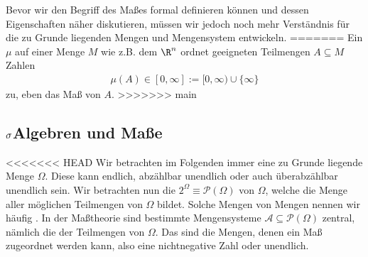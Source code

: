 \documentclass[letterpaper,10pt,english]{jupyterBook}
\begin{document}
\sphinxAtStartPar
Bevor wir den Begriff des Maßes formal definieren können und dessen Eigenschaften näher diskutieren, müssen wir jedoch noch mehr Verständnis für die zu Grunde liegenden Mengen und Mengensystem entwickeln.
=======
Ein  \(\mu\) auf einer Menge \(M\) wie z.B. dem \(\R^n\)
ordnet geeigneten Teilmengen \(A\subseteq M\)
Zahlen
\begin{equation*}
\begin{split}\mu(A)\in[0,\infty]:=[0,\infty)\cup\{\infty\}\end{split}
\end{equation*}
\sphinxAtStartPar
zu, eben das Maß von \(A\).
>>>>>>> main


\subsection{\protect\(\sigma\protect\)\sphinxhyphen{}Algebren und Maße}
\label{\detokenize{masstheorie/masstheorie:sigma-algebren-und-masze}}
\sphinxAtStartPar
<<<<<<< HEAD
Wir betrachten im Folgenden immer eine zu Grunde liegende Menge \(\Omega\).
Diese kann endlich, abzählbar unendlich oder auch überabzählbar unendlich sein.
Wir betrachten nun die  \(2^\Omega \equiv\mathcal{P}(\Omega)\) von \(\Omega\), welche die Menge aller möglichen Teilmengen von \(\Omega\) bildet.
Solche Mengen von Mengen nennen wir häufig .
In der Maßtheorie sind bestimmte Mengensysteme \(\mathcal{A} \subseteq \mathcal{P}(\Omega)\) zentral, nämlich die der  Teilmengen von \(\Omega\).
Das sind die Mengen, denen ein Maß zugeordnet werden kann, also eine nichtnegative Zahl oder unendlich.
\end{document}
